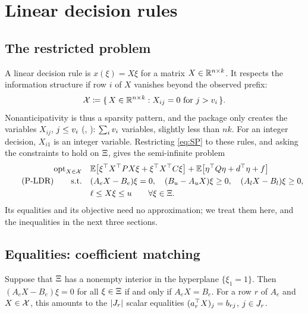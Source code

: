 \section{Linear decision rules}
\label{sec:rules}

\subsection{The restricted problem}

A linear decision rule is $x(\xi) = X\xi$ for a matrix $X \in \mathbb{R}^{n\times k}$.
It respects the information structure if row $i$ of $X$ vanishes beyond the observed prefix:
\[
\mathcal{X} \coloneqq \{\, X \in \mathbb{R}^{n\times k} : X_{ij} = 0 \text{ for } j > v_i \,\}.
\]
Nonanticipativity is thus a sparsity pattern, and the package only creates the variables $X_{ij}$, $j \le v_i$ (, ):
$\sum_i v_i$ variables, slightly less than $nk$.
For an integer decision, $X_{i1}$ is an integer variable.
Restricting \eqref{eq:SP} to these rules, and asking the constraints to hold on $\Xi$, gives the semi-infinite problem
\begin{equation}
\label{eq:PLDR}
\tag{P-LDR}
\begin{aligned}
\operatorname{opt}_{X \in \mathcal{X}} \quad & \mathbb{E}\bigl[ \xi^\top X^\top P X \xi + \xi^\top X^\top C \xi \bigr] + \mathbb{E}\bigl[\eta^\top Q\eta + d^\top\eta + f\bigr] \\
\text{s.t.} \quad & (A_e X - B_e)\xi = 0, \quad (B_u - A_u X)\xi \ge 0, \quad (A_l X - B_l)\xi \ge 0, \\
& \ell \le X\xi \le u \qquad \forall \xi \in \Xi.
\end{aligned}
\end{equation}
Its equalities and its objective need no approximation;
we treat them here, and the inequalities in the next three sections.

\subsection{Equalities: coefficient matching}

\begin{proposition}
\label{prop:matching}
Suppose that $\Xi$ has a nonempty interior in the hyperplane $\{\xi_1 = 1\}$.
Then $(A_e X - B_e)\xi = 0$ for all $\xi \in \Xi$ if and only if $A_e X = B_e$.
For a row $r$ of $A_e$ and $X \in \mathcal{X}$, this amounts to the $\lvert J_r \rvert$ scalar equalities $(a_r^\top X)_j = b_{rj}$, $j \in J_r$.
\end{proposition}

